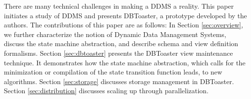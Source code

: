 

There are many technical challenges in making a DDMS a reality. This paper
initiates a study of DDMS and presents DBToaster, a prototype developed by
the authors. The contributions of this paper are as follows:
In Section \ref{sec:overview}, we further characterize the notion of Dynamic Data
Management Systems, discuss the state machine abstraction, and describe
schema and view definition formalisms.
Section \ref{sec:dbtoaster} presents the DBToaster view maintenance technique. It demonstrates how
the state machine abstraction, which calls for the minimization or compilation
of the state transition function leads, to new algorithms.
Section \ref{sec:storage} discusses storage management in DBToaster.
Section \ref{sec:distribution} discusses scaling up through parallelization.

